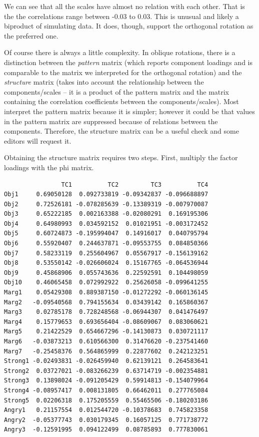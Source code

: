 \documentclass[
  english,
]{book}
\newenvironment{Shaded}{\begin{snugshade}}{\end{snugshade}}
\newcommand{\CommentTok}[1]{\textcolor[rgb]{0.56,0.35,0.01}{\textit{#1}}}
\newcommand{\NormalTok}[1]{#1}
\newcommand{\OperatorTok}[1]{\textcolor[rgb]{0.81,0.36,0.00}{\textbf{#1}}}
\newcommand{\StringTok}[1]{\textcolor[rgb]{0.31,0.60,0.02}{#1}}
\begin{document}
We can see that all the scales have almost no relation with each other. That is the the correlations range between -0.03 to 0.03. This is unusual and likely a biproduct of simulating data. It does, though, support the orthogonal rotation as the preferred one.

Of course there is always a little complexity. In oblique rotations, there is a distinction between the \emph{pattern} matrix (which reports component loadings and is comparable to the matrix we interpreted for the orthogonal rotation) and the \emph{structure} matrix (takes into account the relationship between the components/scales -- it is a product of the pattern matrix and the matrix containing the correlation coefficients between the components/scales). Most interpret the pattern matrix because it is simpler; however it could be that values in the pattern matrix are suppressed because of relations between the components. Therefore, the structure matrix can be a useful check and some editors will request it.

Obtaining the structure matrix requires two steps. First, multiply the factor loadings with the phi matrix.

\begin{Shaded}
\end{Shaded}

\begin{verbatim}
                TC1          TC2         TC3          TC4
Obj1     0.69050128  0.092733819 -0.09342837 -0.096688897
Obj2     0.72526181 -0.078285639 -0.13389319 -0.007970087
Obj3     0.65222185  0.002163388 -0.02080291  0.169195306
Obj4     0.64980993  0.034592152  0.01021951 -0.003172452
Obj5     0.60724873 -0.195994047  0.14916017  0.040795794
Obj6     0.55920407  0.244637871 -0.09553755  0.084850366
Obj7     0.58233119  0.255604967  0.05567917 -0.156139162
Obj8     0.53550142 -0.026606024  0.15167765 -0.064536944
Obj9     0.45868906  0.055743636  0.22592591  0.104498059
Obj10    0.46065458  0.072992922  0.25626058 -0.099641255
Marg1    0.05429308  0.889387150 -0.01272292 -0.060136145
Marg2   -0.09540568  0.794155634  0.03439142  0.165860367
Marg3    0.02785178  0.728248568 -0.06944307  0.041476497
Marg4    0.15779653  0.693656404 -0.08609067  0.083060621
Marg5    0.21422529  0.654667296 -0.14130873  0.030721117
Marg6   -0.03873213  0.610566300  0.31476620 -0.237541460
Marg7   -0.25458376  0.564865999  0.22877602  0.242123251
Strong1 -0.02493831 -0.026459940  0.62139121  0.264583641
Strong2  0.03727021 -0.083266239  0.63714719 -0.002354881
Strong3  0.13898024 -0.091205429  0.59914813 -0.154079964
Strong4 -0.08957417  0.008131805  0.66462011  0.277765084
Strong5  0.02206318  0.175205559  0.55465506 -0.180203186
Angry1   0.21157554  0.012544720 -0.10378683  0.745823358
Angry2  -0.05377743  0.030179345  0.16057125  0.771738772
Angry3  -0.12591995  0.094122499  0.08785893  0.777830061
\end{verbatim}
\end{document}
